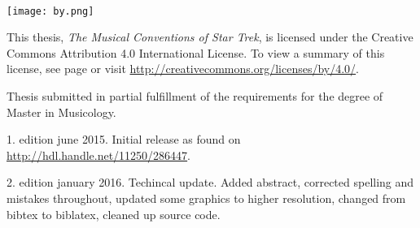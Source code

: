~\vfill
\thispagestyle{empty}

\begin{fullwidth}
\setlength\parindent{0pt}
\begin{minipage}{0.22\linewidth}
\texttt{[image: by.png]}
\end{minipage}
\begin{minipage}{0.8\linewidth}
This thesis, \textit{The Musical Conventions of Star Trek}, is licensed under the Creative Commons Attribution 4.0 International License. To view a summary of this license, see page \pageref{ch:creativecommons} or visit \url{http://creativecommons.org/licenses/by/4.0/}.
\end{minipage}

\vspace{0.5cm}

Thesis submitted in partial fulfillment of the requirements for the degree of Master in Musicology.

\vspace{0.5cm}
1. edition june 2015. Initial release as found on \url{http://hdl.handle.net/11250/286447}.

2. edition january 2016. Techincal update. Added abstract, corrected spelling and mistakes throughout, updated some graphics to higher resolution, changed from bibtex to biblatex, cleaned up source code.
\end{fullwidth}

